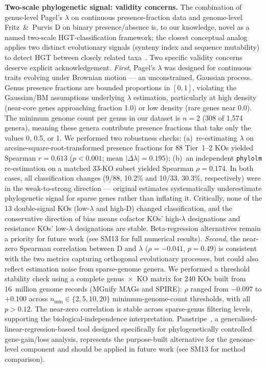 \documentclass[times]{zHenriquesLab-StyleBioRxiv}
\begin{document}
\textbf{Two-scale phylogenetic signal: validity concerns.}
The combination of genus-level Pagel's $\lambda$ on continuous presence-fraction data and genome-level Fritz~\&~Purvis D on binary presence/absence is, to our knowledge, novel as a named two-scale HGT-classification framework; the closest conceptual analog applies two distinct evolutionary signals (synteny index and sequence mutability) to detect HGT between closely related taxa~\cite{adato2015}.
Two specific validity concerns deserve explicit acknowledgement.
\emph{First}, Pagel's $\lambda$ was designed for continuous traits evolving under Brownian motion --- an unconstrained, Gaussian process. Genus presence fractions are bounded proportions in $[0, 1]$, violating the Gaussian/BM assumptions underlying $\lambda$ estimation, particularly at high density (near-core genes approaching fraction 1.0) or low density (rare genes near 0.0). The minimum genome count per genus in our dataset is $n = 2$ (308 of 1,574 genera), meaning these genera contribute presence fractions that take only the values 0, 0.5, or 1. We performed two robustness checks: (a)~re-estimating $\lambda$ on arcsine-square-root-transformed presence fractions for 88 Tier~1--2 KOs yielded Spearman $r = 0.613$ ($p < 0.001$; mean $|\Delta\lambda| = 0.195$); (b)~an independent \texttt{phylolm} re-estimation on a matched 33-KO subset yielded Spearman $\rho = 0.174$. In both cases, all classification changes (9/88, 10.2\% and 10/33, 30.3\%, respectively) were in the weak-to-strong direction --- original estimates systematically underestimate phylogenetic signal for sparse genes rather than inflating it. Critically, none of the 13 double-signal KOs (low-$\lambda$ and high-D) changed classification, and the conservative direction of bias means cofactor KOs' high-$\lambda$ designations and resistance KOs' low-$\lambda$ designations are stable. Beta-regression alternatives remain a priority for future work (see SM13 for full numerical results).
\emph{Second}, the near-zero Spearman correlation between D and $\lambda$ ($\rho = -0.041$, $p = 0.49$) is consistent with the two metrics capturing orthogonal evolutionary processes, but could also reflect estimation noise from sparse-genome genera. We performed a threshold stability check using a complete genus~$\times$~KO matrix for 240 KOs built from 16~million genome records (MGnify MAGs and SPIRE): $\rho$ ranged from $-0.097$ to $+0.100$ across $n_\text{min} \in \{2, 5, 10, 20\}$ minimum-genome-count thresholds, with all $p > 0.12$. The near-zero correlation is stable across sparse-genus filtering levels, supporting the biological-independence interpretation. Panstripe~\cite{tonkinhill2023}, a generalised-linear-regression-based tool designed specifically for phylogenetically controlled gene-gain/loss analysis, represents the purpose-built alternative for the genome-level component and should be applied in future work (see SM13 for method comparison).
\end{document}
